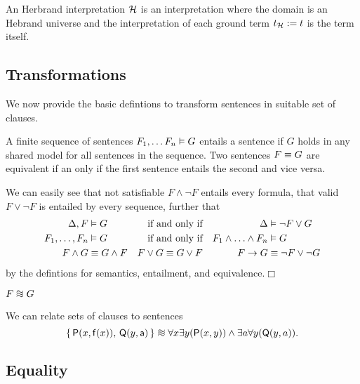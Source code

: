 \begin{definition}
	An {\myem Herbrand interpretation} ${\mathcal H}$ is an interpretation where the domain
	is an Hebrand universe
	and the interpretation of each ground term $t_{\mathcal H} := t$ is the term itself.
\end{definition}

\subsection{Transformations}

\IMPROVE
We now provide the basic defintions to transform sentences in suitable set of clauses.

\begin{definition}[Equivalence]
	A finite sequence of sentences $F_1, \ldots F_n \vDash G$ entails a sentence
	if $G$ holds in any shared model for all sentences in the sequence.
	Two sentences $F \equiv G$ are equivalent
	if an only if the first sentence entails the second and vice versa.
\end{definition}

\begin{lemma}
	We can easily see that not satisfiable $F\land\lnot F$ entails every formula,
	that valid $F\lor\lnot F$ is entailed by every sequence, further that
	\begin{align*}
	\Delta, F&\vDash G  &\text{if and only if} && \Delta &\vDash \lnot F\lor G \\
	F_1,\ldots,F_n&\vDash G  &\text{if and only if} && F_1\land\ldots\land F_n&\vDash G\\
	F\land G&\equiv G\land F &F\lor G\equiv G\lor F && F\rightarrow G &\equiv \lnot F\lor \lnot G
	\end{align*}
	by the defintions for semantics, entailment, and equivalence.\hfill$\Box$
\end{lemma}


\begin{definition}[Equisatisfiability] $F \equisat G$
\end{definition}


\begin{example}We can relate sets of clauses to sentences
	\[
	\{\,\mP(x, \mf(x)),\,\mQ(y,\ma)\,\} \equisat \forall x\exists y(\mP(x,y)) \land \exists a\forall y(\mQ(y,a)) .
	\]
\end{example}



\subsection{Equality}

